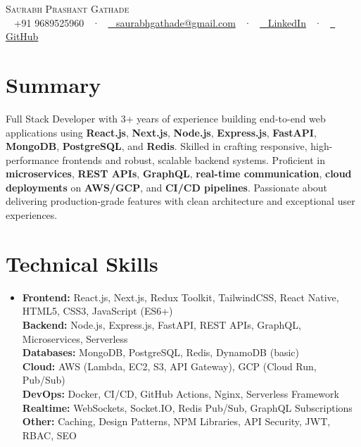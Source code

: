 \documentclass[letterpaper,11pt]{article}
\newcommand{\resumeSubHeadingListStart}{\begin{itemize}[leftmargin=0in,label={}]}
\newcommand{\resumeSubHeadingListEnd}{\end{itemize}}
\begin{document}
\begin{center}
{\Huge \scshape Saurabh Prashant Gathade} \\ \vspace{4pt}
\small
\faPhone~ +91 9689525960 ~·~
\href{mailto:saurabhgathade@gmail.com}{\faEnvelope~ saurabhgathade@gmail.com} ~·~
\href{https://www.linkedin.com/in/saurabhpgathade}{\faLinkedin~ LinkedIn} ~·~
\href{https://github.com/Saurabhgathade131}{\faGithub~ GitHub}
\end{center}

\section{Summary}
\small Full Stack Developer with 3+ years of experience building end-to-end web applications using \textbf{React.js}, \textbf{Next.js}, \textbf{Node.js}, \textbf{Express.js}, \textbf{FastAPI}, \textbf{MongoDB}, \textbf{PostgreSQL}, and \textbf{Redis}. Skilled in crafting responsive, high-performance frontends and robust, scalable backend systems. Proficient in \textbf{microservices}, \textbf{REST APIs}, \textbf{GraphQL}, \textbf{real-time communication}, \textbf{cloud deployments} on \textbf{AWS/GCP}, and \textbf{CI/CD pipelines}. Passionate about delivering production-grade features with clean architecture and exceptional user experiences.

\section{Technical Skills}
\resumeSubHeadingListStart
\item\small{
\textbf{Frontend:} React.js, Next.js, Redux Toolkit, TailwindCSS, React Native, HTML5, CSS3, JavaScript (ES6+) \\
\textbf{Backend:} Node.js, Express.js, FastAPI, REST APIs, GraphQL, Microservices, Serverless \\
\textbf{Databases:} MongoDB, PostgreSQL, Redis, DynamoDB (basic) \\
\textbf{Cloud:} AWS (Lambda, EC2, S3, API Gateway), GCP (Cloud Run, Pub/Sub) \\
\textbf{DevOps:} Docker, CI/CD, GitHub Actions, Nginx, Serverless Framework \\
\textbf{Realtime:} WebSockets, Socket.IO, Redis Pub/Sub, GraphQL Subscriptions \\
\textbf{Other:} Caching, Design Patterns, NPM Libraries, API Security, JWT, RBAC, SEO
}
\resumeSubHeadingListEnd
\vspace{-10pt}
\end{document}
